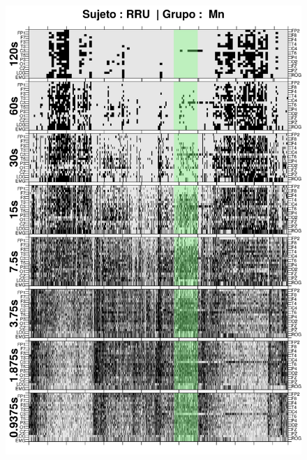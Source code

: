 \begin{figure}
\centering
\includegraphics[width=0.9\linewidth]
{./img_ejemplos/RRMNS_comp_est_.png} 
\end{figure}

